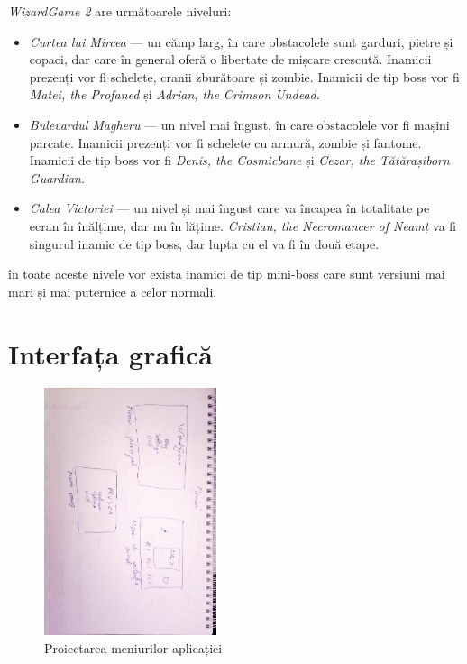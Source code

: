 \documentclass{article}
\begin{document}
    \emph{WizardGame 2} are următoarele niveluri:
    \begin{itemize}
        \item \emph{Curtea lui Mircea} --- un cămp larg, în care obstacolele sunt garduri,
        pietre și copaci, dar care în general oferă o libertate de mișcare crescută. Inamicii
        prezenți vor fi schelete, cranii zburătoare și zombie. Inamicii de tip boss vor fi
        \emph{Matei, the Profaned} și \emph{Adrian, the Crimson Undead}.
        \item \emph{Bulevardul Magheru} --- un nivel mai îngust, în care obstacolele vor fi
        mașini parcate. Inamicii prezenți vor fi schelete cu armură, zombie și fantome. Inamicii
        de tip boss vor fi \emph{Denis, the Cosmicbane} și \emph{Cezar, the Tătărașiborn Guardian}.
        \item \emph{Calea Victoriei} --- un nivel și mai îngust care va încapea în totalitate pe
        ecran în înălțime, dar nu în lățime. \emph{Cristian, the Necromancer of Neamț} va fi
        singurul inamic de tip boss, dar lupta cu el va fi în două etape.
    \end{itemize}

    în toate aceste nivele vor exista inamici de tip mini-boss care sunt versiuni mai mari și mai
    puternice a celor normali.

    \section{Interfața grafică}

    \begin{figure}[H]
        \includegraphics[width=0.45\textwidth, angle=90]{designing-menus}
        \centering
        \caption{Proiectarea meniurilor aplicației}
    \end{figure}
\end{document}
